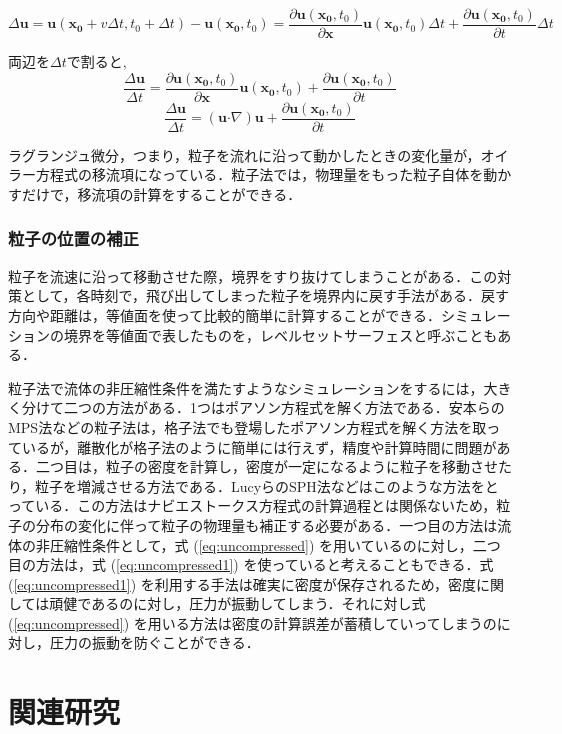\documentclass[a4j,12pt]{jreport}
\begin{document}
$$ \varDelta \bm{u} = \bm{u} (\bm{x_0}+v\varDelta t,t_0+\varDelta t)  - \bm{u} (\bm{x_0},t_0)  = \frac{\partial \bm{u} (\bm{x_0},t_0) }{\partial \bm{x}}\bm{u} (\bm{x_0},t_0) \varDelta t + \frac{\partial \bm{u} (\bm{x_0},t_0) }{\partial t}\varDelta t$$

両辺を$\varDelta t$で割ると,
$$ \frac{\varDelta \bm{u}}{\varDelta t} = \frac{\partial \bm{u} (\bm{x_0},t_0) }{\partial \bm{x}}\bm{u} (\bm{x_0},t_0)  + \frac{\partial \bm{u} (\bm{x_0},t_0) }{\partial t}$$
$$ \frac{\varDelta \bm{u}}{\varDelta t} =  (\bm{u}\boldsymbol{\cdot}\nabla) \bm{u} + \frac{\partial \bm{u} (\bm{x_0},t_0) }{\partial t}$$

ラグランジュ微分，つまり，粒子を流れに沿って動かしたときの変化量が，オイラー方程式の移流項になっている．粒子法では，物理量をもった粒子自体を動かすだけで，移流項の計算をすることができる．

\subsubsection{粒子の位置の補正} \label{subsec:fixparticlepos}
粒子を流速に沿って移動させた際，境界をすり抜けてしまうことがある．この対策として，各時刻で，飛び出してしまった粒子を境界内に戻す手法がある．戻す方向や距離は，等値面を使って比較的簡単に計算することができる．シミュレーションの境界を等値面で表したものを，レベルセットサーフェスと呼ぶこともある．

粒子法で流体の非圧縮性条件を満たすようなシミュレーションをするには，大きく分けて二つの方法がある．1つはポアソン方程式を解く方法である．安本らのMPS法\cite{MPS}などの粒子法は，格子法でも登場したポアソン方程式を解く方法を取っているが，離散化が格子法のように簡単には行えず，精度や計算時間に問題がある．二つ目は，粒子の密度を計算し，密度が一定になるように粒子を移動させたり，粒子を増減させる方法である．Lucyらの\cite{SPH}SPH法などはこのような方法をとっている．この方法はナビエストークス方程式の計算過程とは関係ないため，粒子の分布の変化に伴って粒子の物理量も補正する必要がある．一つ目の方法は流体の非圧縮性条件として，式 (\ref{eq:uncompressed}) を用いているのに対し，二つ目の方法は，式 (\ref{eq:uncompressed1}) を使っていると考えることもできる．式 (\ref{eq:uncompressed1}) を利用する手法は確実に密度が保存されるため，密度に関しては頑健であるのに対し，圧力が振動してしまう．それに対し式 (\ref{eq:uncompressed}) を用いる方法は密度の計算誤差が蓄積していってしまうのに対し，圧力の振動を防ぐことができる．

\section{関連研究} \label{sec:reratedworks}
\end{document}
